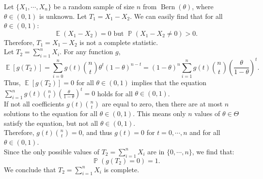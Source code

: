 \documentclass{huhtakm-template-book-v2}
\DeclareMathOperator{\prob}{\mathbb{P}}
\DeclareMathOperator{\E}{\mathbb{E}}
\DeclareMathOperator{\Bern}{Bern}
\begin{document}
    \begin{eg}
        Let $\{X_{1},\cdots,X_{n}\}$ be a random sample of size $n$ from $\Bern(\theta)$, where $\theta\in(0,1)$ is unknown. Let $T_{1}=X_{1}-X_{2}$. We can easily find that for all $\theta\in(0,1)$:
        \begin{equation*}
            \E(X_{1}-X_{2})=0\text{ but }\prob(X_{1}-X_{2}\neq 0)>0.
        \end{equation*}
        Therefore, $T_{1}=X_{1}-X_{2}$ is not a complete statistic.\\
        Let $T_{2}=\sum_{i=1}^{n}X_{i}$. For any function $g$,
        \begin{equation*}
            \E[g(T_{2})]=\sum_{i=0}^{n}g(t)\binom{n}{t}\theta^{t}(1-\theta)^{n-t}=(1-\theta)^{n}\sum_{i=1}^{n}g(t)\binom{n}{t}\left(\frac{\theta}{1-\theta}\right)^{t}.
        \end{equation*}
        Thus, $\E[g(T_{2})]=0$ for all $\theta\in(0,1)$ implies that the equation $\sum_{i=1}^{n}g(t)\binom{n}{t}\left(\frac{\theta}{1-\theta}\right)^{t}=0$ holds for all $\theta\in(0,1)$.\\
        If not all coefficients $g(t)\binom{n}{t}$ are equal to zero, then there are at most $n$ solutions to the equation for all $\theta\in(0,1)$. This means only $n$ values of $\theta\in\Theta$ satisfy the equation, but not all $\theta\in(0,1)$.\\
        Therefore, $g(t)\binom{n}{t}=0$, and thus $g(t)=0$ for $t=0,\cdots,n$ and for all $\theta\in(0,1)$.\\
        Since the only possible values of $T_{2}=\sum_{i=1}^{n}X_{i}$ are in $\{0,\cdots,n\}$, we find that:
        \begin{equation*}
            \prob(g(T_{2})=0)=1.
        \end{equation*}
        We conclude that $T_{2}=\sum_{i=1}^{n}X_{i}$ is complete.
    \end{eg}
\end{document}
